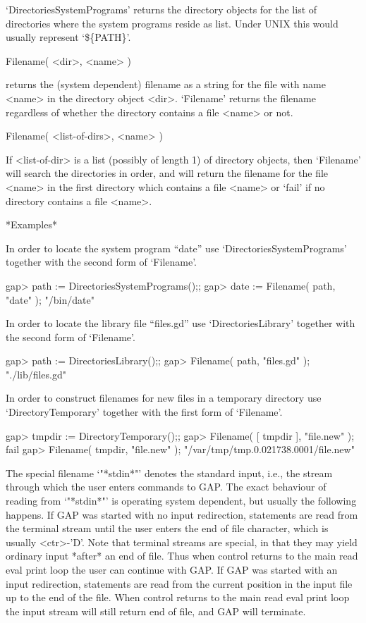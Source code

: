 `DirectoriesSystemPrograms' returns the directory objects for the list of
directories where  the system programs reside as  list.  Under  UNIX this
would usually represent `\$\{PATH\}'.


\>Filename( <dir>, <name> )

returns the (system  dependent)  filename as  a string for  the file with
name   <name> in the  directory  object  <dir>.   `Filename' returns  the
filename regardless of  whether the directory contains  a file <name>  or
not.

\>Filename( <list-of-dirs>, <name> )

If <list-of-dir>  is a list (possibly of  length 1) of directory objects,
then `Filename' will search the directories in order, and will return the
filename for the file <name> in the first directory which contains a file
<name> or `fail' if no directory contains a file <name>.

*Examples*

In    order  to      locate   the    system   program    ``date''     use
`DirectoriesSystemPrograms' together with the second form of `Filename'.

\begintt
    gap> path := DirectoriesSystemPrograms();;
    gap> date := Filename( path, "date" );
    "/bin/date"
\endtt

In order to locate the library file ``files.gd'' use `DirectoriesLibrary'
together with the second form of `Filename'.

\begintt
    gap> path := DirectoriesLibrary();;
    gap> Filename( path, "files.gd" );
    "./lib/files.gd"
\endtt

In  order to construct filenames for  new  files in a temporary directory
use `DirectoryTemporary' together with the first form of `Filename'.

\begintt
    gap> tmpdir := DirectoryTemporary();;
    gap> Filename( [ tmpdir ], "file.new" );
    fail
    gap> Filename( tmpdir, "file.new" );    
    "/var/tmp/tmp.0.021738.0001/file.new"
\endtt


The special filename `"*stdin*"'   denotes the standard input, i.e.,  the
stream   through   which the  user  enters  commands  to  GAP.  The exact
behaviour of reading from `"*stdin*"' is  operating system dependent, but
usually   the  following happens.   If  GAP   was started with  no  input
redirection, statements are read from  the terminal stream until the user
enters the end of file character, which  is usually <ctr>-'D'.  Note that
terminal streams  are  special, in   that they may  yield ordinary  input
*after* an end of file.  Thus when control returns to  the main read eval
print loop  the user can continue with  GAP.  If GAP  was started with an
input redirection, statements are read  from the current position in  the
input file up to the  end of the file.   When control returns to the main
read eval print loop the input stream will still  return end of file, and
GAP will terminate.

